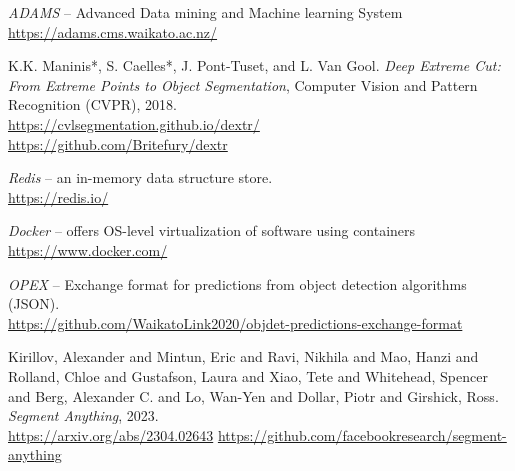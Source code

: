 
\begin{thebibliography}{999}

		\textit{ADAMS} -- Advanced Data mining and Machine learning System \\
		\url{https://adams.cms.waikato.ac.nz/}{}

		K.K. Maninis*, S. Caelles*, J. Pont-Tuset, and L. Van Gool.
        \textit{Deep Extreme Cut: From Extreme Points to Object Segmentation},
        Computer Vision and Pattern Recognition (CVPR), 2018. \\
		\url{https://cvlsegmentation.github.io/dextr/}{} \\
		\url{https://github.com/Britefury/dextr}{}

		\textit{Redis} -- an in-memory data structure store. \\
		\url{https://redis.io/}{}

		\textit{Docker} -- offers OS-level virtualization of software using containers \\
		\url{https://www.docker.com/}{}

		\textit{OPEX} -- Exchange format for predictions from object detection algorithms (JSON). \\
		\url{https://github.com/WaikatoLink2020/objdet-predictions-exchange-format}{}

	    Kirillov, Alexander and Mintun, Eric and Ravi, Nikhila and Mao, Hanzi and Rolland, Chloe and Gustafson,
	    Laura and Xiao, Tete and Whitehead, Spencer and Berg, Alexander C. and Lo, Wan-Yen and Dollar, Piotr and
	    Girshick, Ross. \textit{Segment Anything}, 2023. \\
		\url{https://arxiv.org/abs/2304.02643}{}
		\url{https://github.com/facebookresearch/segment-anything}{}

\end{thebibliography}
